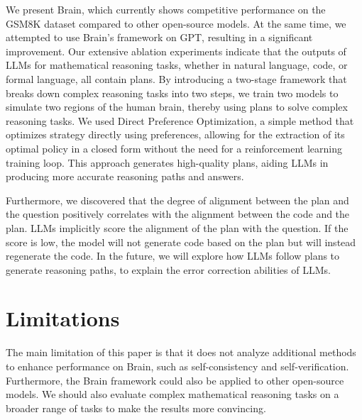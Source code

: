 \documentclass[11pt]{article}
\begin{document}
We present Brain, which currently shows competitive performance on the GSM8K dataset compared to other open-source models. At the same time, we attempted to use Brain's framework on GPT, resulting in a significant improvement. Our extensive ablation experiments indicate that the outputs of LLMs for mathematical reasoning tasks, whether in natural language, code, or formal language, all contain plans. By introducing a two-stage framework that breaks down complex reasoning tasks into two steps, we train two models to simulate two regions of the human brain, thereby using plans to solve complex reasoning tasks. We used Direct Preference Optimization, a simple method that optimizes strategy directly using preferences, allowing for the extraction of its optimal policy in a closed form without the need for a reinforcement learning training loop. This approach generates high-quality plans, aiding LLMs in producing more accurate reasoning paths and answers.


Furthermore, we discovered that the degree of alignment between the plan and the question positively correlates with the alignment between the code and the plan. LLMs implicitly score the alignment of the plan with the question. If the score is low, the model will not generate code based on the plan but will instead regenerate the code. In the future, we will explore how LLMs follow plans to generate reasoning paths, to explain the error correction abilities of LLMs.

\newpage
\section*{Limitations}


The main limitation of this paper is that it does not analyze additional methods to enhance performance on Brain, such as self-consistency and self-verification. Furthermore, the Brain framework could also be applied to other open-source models. We should also evaluate complex mathematical reasoning tasks on a broader range of tasks to make the results more convincing.
\end{document}
